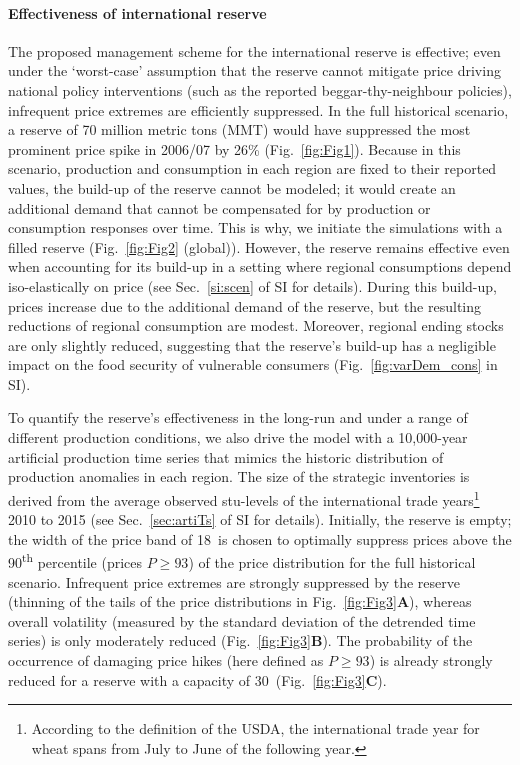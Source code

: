 \documentclass[12pt]{article}
\begin{document}
\paragraph*{Effectiveness of international reserve}
The proposed management scheme for the international reserve is effective; even under the `worst-case' assumption that the reserve cannot mitigate price driving national policy interventions (such as the reported beggar-thy-neighbour policies), infrequent price extremes are efficiently suppressed. In the full historical scenario, a reserve of 70 million metric tons (MMT) would have suppressed the most prominent price spike in 2006/07 by 26\% (Fig.~\ref{fig:Fig1}). Because in this scenario, production and consumption in each region are fixed to their reported values, the build-up of the reserve cannot be modeled; it would create an additional demand that cannot be compensated for by production or consumption responses over time. This is why, we initiate the simulations with a filled reserve (Fig.~\ref{fig:Fig2} (global)). However, the reserve remains effective even when accounting for its build-up in a setting where regional consumptions depend iso-elastically on price (see Sec.~\ref{si:scen} of SI for details).  During this build-up, prices increase due to the additional demand of the reserve, but the resulting reductions of regional consumption are modest. Moreover, regional ending stocks are only slightly reduced, suggesting that the reserve's build-up has a negligible impact on the food security of vulnerable consumers (Fig.~\ref{fig:varDem_cons} in SI).

To quantify the reserve's effectiveness in the long-run and under a range of different production conditions, we also drive the model with a 10,000-year artificial production time series that mimics the historic distribution of production anomalies in each region. The size of the strategic inventories is derived from the average observed stu-levels of the international trade years\footnote{According to the definition of the USDA, the international trade year for wheat spans from July to June of the following year.} 2010 to 2015 (see Sec.~\ref{sec:artiTs} of SI for details). Initially, the reserve is empty; the width of the price band of 18\USD~is chosen to optimally suppress prices above the 90\textsuperscript{th} percentile (prices $P\geq 93$\USD) of the price distribution for the full historical scenario. Infrequent price extremes are strongly suppressed by the reserve (thinning of the tails of the price distributions in Fig.~\ref{fig:Fig3}\textbf{A}), whereas overall volatility (measured by the standard deviation of the detrended time series) is only moderately reduced (Fig.~\ref{fig:Fig3}\textbf{B}). The probability of the occurrence of damaging price hikes (here defined as $P\geq 93$\USD) is already strongly reduced for a reserve with a capacity of 30\mmt~(Fig.~\ref{fig:Fig3}\textbf{C}).
\end{document}
